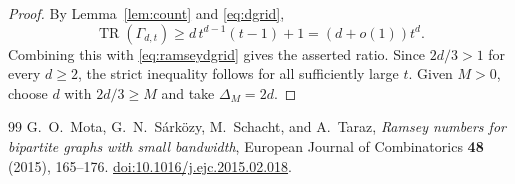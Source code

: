 \documentclass[10pt,a4paper]{amsart}
\DeclareMathOperator{\TR}{TR}
\begin{document}
\begin{proof}
By Lemma~\ref{lem:count} and \eqref{eq:dgrid},
\[
\TR(\Gamma_{d,t}) \geq d\, t^{d-1}(t-1) + 1 = (d + o(1)) t^d.
\]
Combining this with \eqref{eq:ramseydgrid} gives the asserted ratio. Since $2d/3 > 1$ for every $d \geq 2$, the strict inequality follows for all sufficiently large $t$. Given $M > 0$, choose $d$ with $2d/3 \geq M$ and take $\Delta_M = 2d$.
\end{proof}


\begin{thebibliography}{99}
 G.~O.~Mota, G.~N.~S\'ark\"ozy, M.~Schacht, and A.~Taraz, \emph{Ramsey numbers for bipartite graphs with small bandwidth}, European Journal of Combinatorics \textbf{48} (2015), 165--176. \href{https://doi.org/10.1016/j.ejc.2015.02.018}{doi:10.1016/j.ejc.2015.02.018}.
\end{thebibliography}
\end{document}
